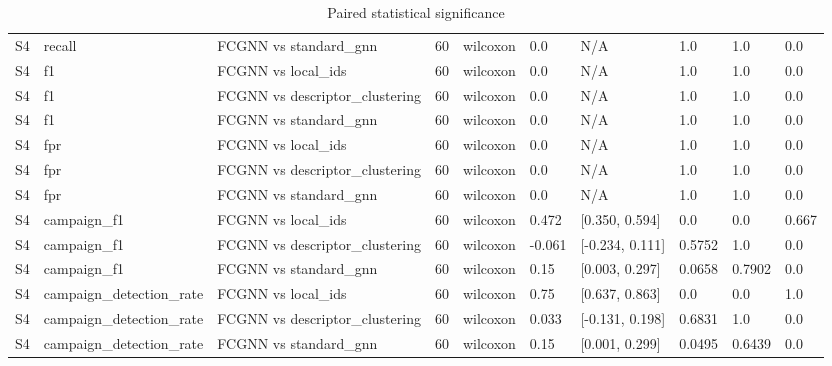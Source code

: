 \begin{table}[t]
\begin{tabular}{llllllllll}
S4 & recall & FCGNN vs standard\_gnn & 60 & wilcoxon & 0.0 & N/A & 1.0 & 1.0 & 0.0 \\
S4 & f1 & FCGNN vs local\_ids & 60 & wilcoxon & 0.0 & N/A & 1.0 & 1.0 & 0.0 \\
S4 & f1 & FCGNN vs descriptor\_clustering & 60 & wilcoxon & 0.0 & N/A & 1.0 & 1.0 & 0.0 \\
S4 & f1 & FCGNN vs standard\_gnn & 60 & wilcoxon & 0.0 & N/A & 1.0 & 1.0 & 0.0 \\
S4 & fpr & FCGNN vs local\_ids & 60 & wilcoxon & 0.0 & N/A & 1.0 & 1.0 & 0.0 \\
S4 & fpr & FCGNN vs descriptor\_clustering & 60 & wilcoxon & 0.0 & N/A & 1.0 & 1.0 & 0.0 \\
S4 & fpr & FCGNN vs standard\_gnn & 60 & wilcoxon & 0.0 & N/A & 1.0 & 1.0 & 0.0 \\
S4 & campaign\_f1 & FCGNN vs local\_ids & 60 & wilcoxon & 0.472 & [0.350, 0.594] & 0.0 & 0.0 & 0.667 \\
S4 & campaign\_f1 & FCGNN vs descriptor\_clustering & 60 & wilcoxon & -0.061 & [-0.234, 0.111] & 0.5752 & 1.0 & 0.0 \\
S4 & campaign\_f1 & FCGNN vs standard\_gnn & 60 & wilcoxon & 0.15 & [0.003, 0.297] & 0.0658 & 0.7902 & 0.0 \\
S4 & campaign\_detection\_rate & FCGNN vs local\_ids & 60 & wilcoxon & 0.75 & [0.637, 0.863] & 0.0 & 0.0 & 1.0 \\
S4 & campaign\_detection\_rate & FCGNN vs descriptor\_clustering & 60 & wilcoxon & 0.033 & [-0.131, 0.198] & 0.6831 & 1.0 & 0.0 \\
S4 & campaign\_detection\_rate & FCGNN vs standard\_gnn & 60 & wilcoxon & 0.15 & [0.001, 0.299] & 0.0495 & 0.6439 & 0.0 \\
\bottomrule
\end{tabular}
\caption{Paired statistical significance}
\label{tab:statistical_significance}
\end{table}
